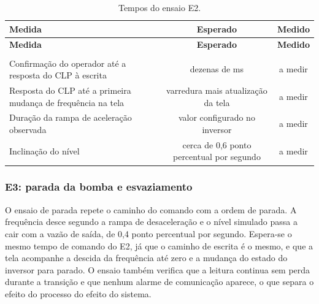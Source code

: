 
{\renewcommand{\arraystretch}{1.3}\small
\begin{xltabular}{\textwidth}{Xcc}
        \caption{Tempos do ensaio E2.}
        \label{tab:cap7_e2}\\
        \hline
        \textbf{Medida} & \textbf{Esperado} & \textbf{Medido} \\
        \hline
        \endfirsthead
        \hline
        \textbf{Medida} & \textbf{Esperado} & \textbf{Medido} \\
        \hline
        \endhead
        \endfoot
         \\
        \endlastfoot
        Confirmação do operador até a resposta do CLP à escrita & dezenas de ms & a medir \\
        \hline
        Resposta do CLP até a primeira mudança de frequência na tela & varredura mais atualização da tela & a medir \\
        \hline
        Duração da rampa de aceleração observada & valor configurado no inversor & a medir \\
        \hline
        Inclinação do nível & cerca de 0,6 ponto percentual por segundo & a medir \\
        \hline
\end{xltabular}}


\subsubsection{E3: parada da bomba e esvaziamento}

\par O ensaio de parada repete o caminho do comando com a ordem de parada. A frequência desce segundo a rampa de desaceleração e o nível simulado passa a cair com a vazão de saída, de 0,4 ponto percentual por segundo. Espera-se o mesmo tempo de comando do E2, já que o caminho de escrita é o mesmo, e que a tela acompanhe a descida da frequência até zero e a mudança do estado do inversor para parado. O ensaio também verifica que a leitura continua sem perda durante a transição e que nenhum alarme de comunicação aparece, o que separa o efeito do processo do efeito do sistema.

